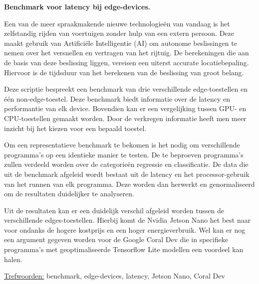 \textbf{Benchmark voor latency bij edge-devices.}

Een van de meer spraakmakende nieuwe technologie\"en van vandaag is het zelfstandig rijden van voertuigen zonder hulp van een extern persoon. Deze maakt gebruik van Artifici\"ele Intelligentie (AI) om autonome beslissingen te nemen over het versnellen en vertragen van het rijtuig. De berekeningen die aan de basis van deze beslissing liggen, vereisen een uiterst accurate locatiebepaling. Hiervoor is de tijdsduur van het berekenen van de beslissing van groot belang.

Deze scriptie bespreekt een benchmark van drie verschillende edge-toestellen en \'e\'en non-edge-toestel. Deze benchmark biedt informatie over de latency en performantie van elk device. Bovendien kan er een vergelijking tussen GPU- en CPU-toestellen gemaakt worden. Door de verkregen informatie heeft men meer inzicht bij het kiezen voor een bepaald toestel.

Om een representatieve benchmark te bekomen is het nodig om verschillende programma's op een identieke manier te testen. De te beproeven programma's zullen verdeeld worden over de categorie\"en regressie en classificatie. De data die uit de benchmark afgeleid wordt bestaat uit de latency en het processor-gebruik van het runnen van elk programma. Deze worden dan herwerkt en genormaliseerd om de resultaten duidelijker te analyseren.

Uit de resultaten kan er een duidelijk verschil afgeleid worden tussen de verschillende edges-toestellen. Hierbij komt de Nvidia Jetson Nano het best naar voor ondanks de hogere kostprijs en een hoger energieverbruik. Wel kan er nog een argument gegeven worden voor de Google Coral Dev die in specifieke programma's met geoptimaliseerde Tensorflow Lite modellen een voordeel kan halen.











\underline{Trefwoorden:} benchmark, edge-devices, latency, Jetson Nano, Coral Dev